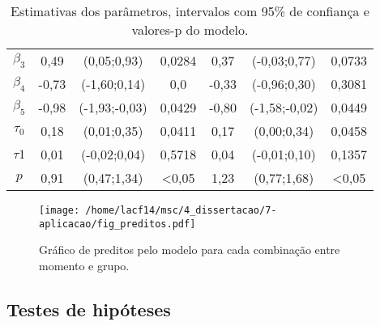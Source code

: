\begin{table}[H]
\begin{tabular}{c|cccccc}
$\beta_3$                  & 0,49       & (0,05;0,93)                                                       & \multicolumn{1}{c|}{0,0284} & 0,37       & (-0,03;0,77)                                                      & 0,0733           \\
$\beta_4$                  & -0,73      & (-1,60;0,14)                                                      & \multicolumn{1}{c|}{0,0}            & -0,33      & (-0,96;0,30)                                                      & 0,3081           \\
$\beta_5$                  & -0,98      & (-1,93;-0,03)                                                     & \multicolumn{1}{c|}{0,0429} & -0,80      & (-1,58;-0,02)                                                     & 0,0449 \\
$\tau_0$                   & 0,18       & (0,01;0,35)                                                       & \multicolumn{1}{c|}{0,0411} & 0,17       & (0,00;0,34)                                                       & 0,0458           \\
$\tau1$                    & 0,01       & (-0,02;0,04)                                                      & \multicolumn{1}{c|}{0,5718}           & 0,04       & (-0,01;0,10)                                                      & 0,1357           \\
$p$                        & 0,91       & (0,47;1,34)                                                       & \multicolumn{1}{c|}{\textless 0,05} & 1,23       & (0,77;1,68)                                                       & \textless 0,05 \\ \hline
\end{tabular}
\caption{Estimativas dos parâmetros, intervalos com 95\% de confiança e valores-p do modelo.}
\label{tab:estimativas}
\end{table}

\begin{figure}[H]
\centering
\texttt{[image: /home/lacf14/msc/4\_dissertacao/7-aplicacao/fig\_preditos.pdf]}
\caption{Gráfico de preditos pelo modelo para cada combinação entre momento e grupo.}
\label{fig:preds}
\end{figure}


\subsection{Testes de hipóteses}

